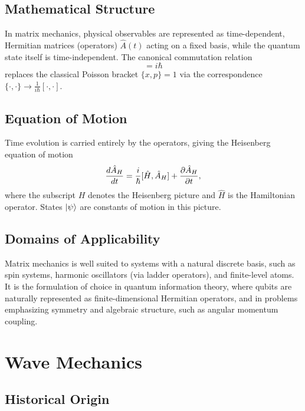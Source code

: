 \documentclass[11pt,a4paper]{article}
\begin{document}
\subsection{Mathematical Structure}

In matrix mechanics, physical observables are represented as time-dependent, Hermitian matrices (operators) $\hat{A}(t)$ acting on a fixed basis, while the quantum state itself is time-independent. The canonical commutation relation
\begin{equation}
    [\hat{x}, \hat{p}] = i\hbar
\end{equation}
replaces the classical Poisson bracket $\{x,p\}=1$ via the correspondence $\{\cdot,\cdot\} \to \frac{1}{i\hbar}[\cdot,\cdot]$.

\subsection{Equation of Motion}

Time evolution is carried entirely by the operators, giving the Heisenberg equation of motion
\begin{equation}
    \frac{d\hat{A}_H}{dt} = \frac{i}{\hbar}[\hat{H}, \hat{A}_H] + \pdv{\hat{A}_H}{t},
\end{equation}
where the subscript $H$ denotes the Heisenberg picture and $\hat{H}$ is the Hamiltonian operator. States $\ket{\psi}$ are constants of motion in this picture.

\subsection{Domains of Applicability}

Matrix mechanics is well suited to systems with a natural discrete basis, such as spin systems, harmonic oscillators (via ladder operators), and finite-level atoms. It is the formulation of choice in quantum information theory, where qubits are naturally represented as finite-dimensional Hermitian operators, and in problems emphasizing symmetry and algebraic structure, such as angular momentum coupling.

\section{Wave Mechanics}

\subsection{Historical Origin}
\end{document}
